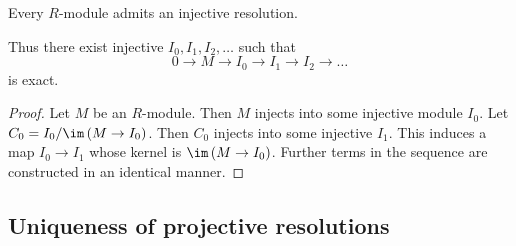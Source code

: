 \begin{proposition}
Every $ R $-module admits an injective resolution.
\end{proposition}

Thus there exist injective $ I_0, I_1, I_2, \dots $ such that
$$ 0 \to M \to I_0 \to I_1 \to I_2 \to \dots $$
is exact.

\begin{proof}
Let $ M $ be an $ R $-module. Then $ M $ injects into some injective module $ I_0 $. Let $ C_0 = I_0 / \im \br{M \to I_0} $. Then $ C_0 $ injects into some injective $ I_1 $. This induces a map $ I_0 \to I_1 $ whose kernel is $ \im \br{M \to I_0} $. Further terms in the sequence are constructed in an identical manner.
\end{proof}

\subsection{Uniqueness of projective resolutions}

